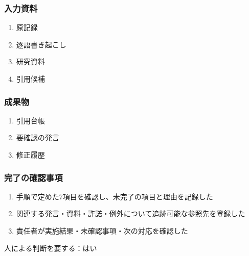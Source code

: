 \documentclass[a4paper,11pt]{article}
\begin{document}
\subsubsection*{入力資料}
\begin{enumerate}[leftmargin=2em,itemsep=0.35em]
\item 原記録
\item 逐語書き起こし
\item 研究資料
\item 引用候補
\end{enumerate}
\subsubsection*{成果物}
\begin{enumerate}[leftmargin=2em,itemsep=0.35em]
\item 引用台帳
\item 要確認の発言
\item 修正履歴
\end{enumerate}
\subsubsection*{完了の確認事項}
\begin{enumerate}[leftmargin=2em,itemsep=0.35em]
\item 手順で定めた7項目を確認し、未完了の項目と理由を記録した
\item 関連する発言・資料・許諾・例外について追跡可能な参照先を登録した
\item 責任者が実施結果・未確認事項・次の対応を確認した
\end{enumerate}
\par 人による判断を要する：はい\par\medskip
\end{document}
